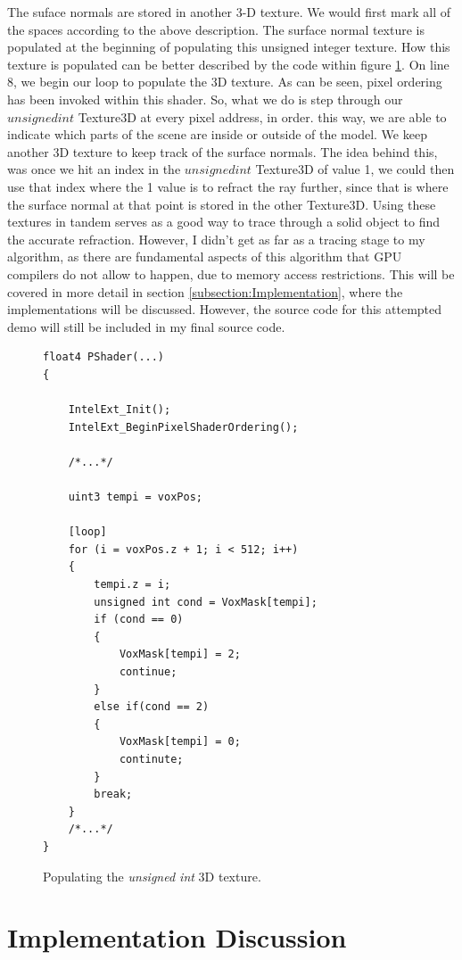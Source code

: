 \documentclass[a4paper, 12pt]{article}
\begin{document}
\noindent The suface normals are stored in another 3-D texture. We would first
mark all of the spaces according to the above description. The surface normal
texture is populated at the beginning of populating this unsigned integer
texture. How this texture is populated can be better described by the code
within figure \ref{code:3DTexPop}. On line 8, we begin our loop to populate
the 3D texture. As can be seen, pixel ordering has been invoked within this
shader. So, what we do is step through our $unsigned int$ Texture3D at every
pixel address, in order. this way, we are able to indicate which parts of the
scene are inside or outside of the model. We keep another 3D texture to keep
track of the surface normals. The idea behind this, was once we hit an index
in the $unsigned int$ Texture3D of value 1, we could then use that index where
the 1 value is to refract the ray further, since that is where the surface
normal at that point is stored in the other Texture3D. Using these textures in
tandem serves as a good way to trace through a solid object to find the
accurate refraction. However, I didn't get as far as a tracing stage to my
algorithm, as there are fundamental aspects of this algorithm that GPU
compilers do not allow to happen, due to memory access restrictions. This will
be covered in more detail in section \ref{subsection:Implementation}, where
the implementations will be discussed. However, the source code for this
attempted demo will still be included in my final source code.

\begin{figure}[h]
\begin{lstlisting}[breaklines=true,language=HLSL]
float4 PShader(...)
{

	IntelExt_Init();
	IntelExt_BeginPixelShaderOrdering();

	/*...*/

	uint3 tempi = voxPos;

	[loop]
	for (i = voxPos.z + 1; i < 512; i++)
	{
		tempi.z = i;
		unsigned int cond = VoxMask[tempi];
		if (cond == 0)
		{
			VoxMask[tempi] = 2;
			continue;
		}
		else if(cond == 2)
		{
			VoxMask[tempi] = 0;
			continute;
		}
		break;
	}
	/*...*/
}
\end{lstlisting}
\caption{Populating the \textit{unsigned int} 3D texture.}
\label{code:3DTexPop}
\end{figure}

\section{Implementation Discussion}
\label{section:ImplementationDiscussion}
\end{document}
